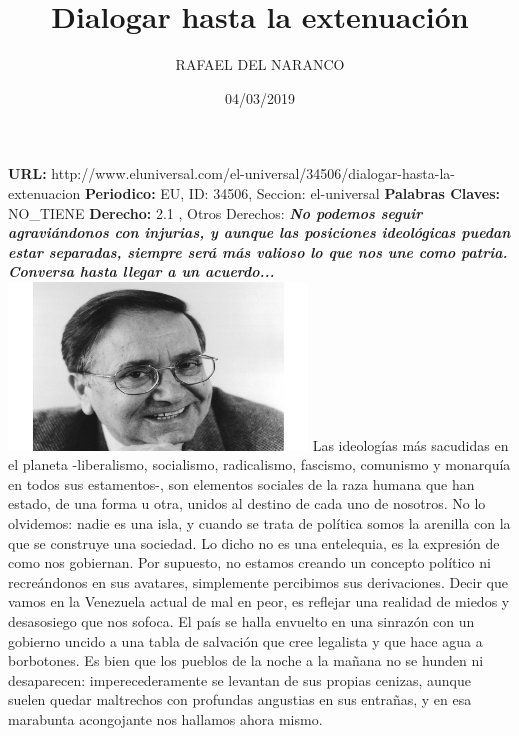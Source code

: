 \documentclass{article}%
\title{\textbf{Dialogar hasta la extenuación}}%
\author{RAFAEL DEL NARANCO}%
\date{04/03/2019}%
\begin{document}
%
\normalsize%
\maketitle%
\textbf{URL: }%
http://www.eluniversal.com/el{-}universal/34506/dialogar{-}hasta{-}la{-}extenuacion\newline%
%
\textbf{Periodico: }%
EU, %
ID: %
34506, %
Seccion: %
el{-}universal\newline%
%
\textbf{Palabras Claves: }%
NO\_TIENE\newline%
%
\textbf{Derecho: }%
2.1%
, Otros Derechos: %
\newline%
%
\textbf{\textit{No podemos seguir agraviándonos con injurias, y aunque las posiciones ideológicas puedan estar separadas, siempre será más valioso lo que nos une como patria. Conversa hasta llegar a un acuerdo...}}%
\newline%
\newline%
%
\includegraphics[width=300px]{EU_34506.jpg}%
\newline%
%
Las ideologías más sacudidas en el planeta {-}liberalismo, socialismo, radicalismo, fascismo, comunismo y monarquía en todos sus estamentos{-}, son elementos sociales de la raza humana que han estado, de una forma u otra, unidos al destino de cada uno de nosotros. No lo olvidemos: nadie es una isla, y cuando se trata de política somos la arenilla con la que se construye una sociedad.%
\newline%
%
Lo dicho no es una entelequia, es la expresión de como nos gobiernan. Por supuesto, no estamos creando un concepto político ni recreándonos en sus avatares, simplemente percibimos sus derivaciones.%
\newline%
%
Decir que vamos en la Venezuela actual de mal en peor, es reflejar una realidad de miedos y desasosiego que nos sofoca. El país se halla envuelto en una sinrazón con un gobierno uncido a una tabla de salvación que cree legalista y que hace agua a borbotones.%
\newline%
%
Es bien que los pueblos de la noche a la mañana no se hunden ni desaparecen: imperecederamente se levantan de sus propias cenizas, aunque suelen quedar maltrechos con profundas angustias en sus entrañas, y en esa marabunta acongojante nos hallamos ahora mismo.%
\end{document}
